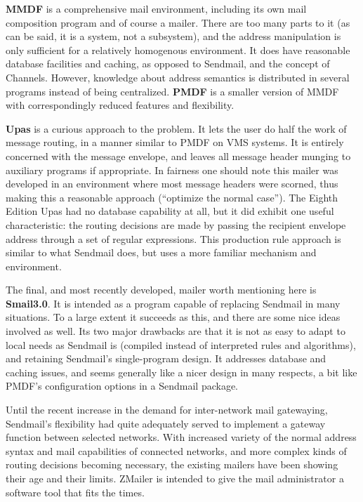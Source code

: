 {\bf MMDF} is a comprehensive mail environment, including its own mail
composition program and of course a mailer.  There are too many parts to it
(as can be said, it is a system, not a subsystem), and the address
manipulation is only sufficient for a relatively homogenous environment. It
does have reasonable database facilities and caching, as opposed to
Sendmail, and the concept of Channels.  However, knowledge about address
semantics is distributed in several programs instead of being centralized.
{\bf PMDF} is a smaller version of MMDF with correspondingly reduced features and
flexibility.

{\bf Upas} is a curious approach to the problem. It lets the user do half the
work of message routing, in a manner similar to PMDF on VMS systems. It is
entirely concerned with the message envelope, and leaves all message header
munging to auxiliary programs if appropriate. In fairness one should note
this mailer was developed in an environment where most message headers were
scorned, thus making this a reasonable approach (``optimize the normal
case''). The Eighth Edition Upas had no database capability at all, but it
did exhibit one useful characteristic: the routing decisions are made by
passing the recipient envelope address through a set of regular
expressions. This production rule approach is similar to what Sendmail
does, but uses a more familiar mechanism and environment.

The final, and most recently developed, mailer worth mentioning here is
{\bf Smail3.0}. It is intended as a program capable of replacing Sendmail in many
situations. To a large extent it succeeds as this, and there are some nice
ideas involved as well. Its two major drawbacks are that it is not as easy
to adapt to local needs as Sendmail is (compiled instead of interpreted
rules and algorithms), and retaining Sendmail's single-program design.  It
addresses database and caching issues, and seems generally like a nicer
design in many respects, a bit like PMDF's configuration options in a
Sendmail package.

Until the recent increase in the demand for inter-network mail gatewaying,
Sendmail's flexibility had quite adequately served to implement a gateway
function between selected networks.  With increased variety of the normal
address syntax and mail capabilities of connected networks, and more complex
kinds of routing decisions becoming necessary, the existing mailers have
been showing their age and their limits.  ZMailer is intended to give the
mail administrator a software tool that fits the times.

